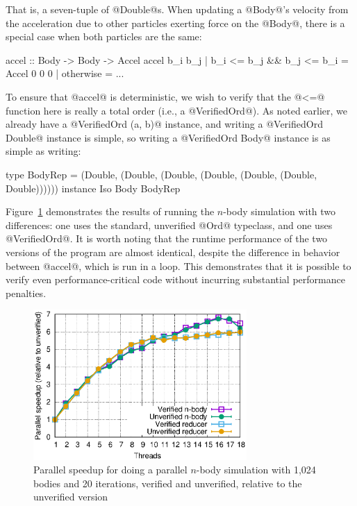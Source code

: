 That is, a seven-tuple of @Double@s. When updating a @Body@'s velocity from the
acceleration due to other particles exerting force on the @Body@, there is a
special case when both particles are the same:

\begin{code}
  accel :: Body -> Body -> Accel
  accel b_i b_j
    | b_i <= b_j && b_j <= b_i = Accel 0 0 0
    | otherwise = ...
\end{code}

To ensure that @accel@ is deterministic, we wish to verify that the @<=@ function
here is really a total order (i.e., a @VerifiedOrd@). As noted earlier, we already
have a @VerifiedOrd (a, b)@ instance, and writing a @VerifiedOrd Double@ instance
is simple, so writing a @VerifiedOrd Body@ instance is as simple as writing:

\begin{code}
type BodyRep = (Double, (Double, (Double,
  (Double, (Double, (Double, Double))))))
instance Iso Body BodyRep
\end{code}

Figure~\ref{fig:nbody} demonstrates the results of running the $n$-body simulation
with two differences: one uses the standard, unverified @Ord@ typeclass, and one
uses @VerifiedOrd@. It is worth noting that the runtime performance of the two
versions of the program are almost identical, despite the difference in behavior
between @accel@, which is run in a loop.
This demonstrates that it is possible
to verify even performance-critical code without incurring substantial performance
penalties.

\begin{figure}
  \begin{center}
    \includegraphics[width=3.2in]{text/refinementreflection/nbody.eps}
  \end{center}
  \caption{Parallel speedup for doing a parallel $n$-body simulation with
    1,024 bodies and 20 iterations, verified and unverified, relative to the
    unverified version}
  \label{fig:nbody}
\end{figure}

